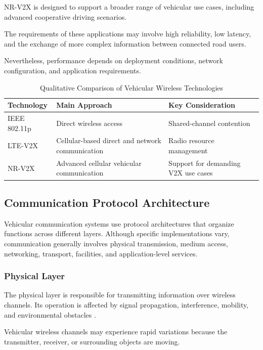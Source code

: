 NR-V2X is designed to support
a broader range of vehicular
use cases, including advanced
cooperative driving scenarios.

The requirements of these
applications may involve
high reliability, low latency,
and the exchange of more
complex information between
connected road users.

Nevertheless, performance
depends on deployment
conditions, network
configuration, and
application requirements.

\begin{table}[htbp]
\centering
\caption{Qualitative Comparison of Vehicular Wireless Technologies}
\label{tab:wireless_technologies}
\footnotesize
\begin{tabular}{|p{1.7cm}|p{2.2cm}|p{2.5cm}|}
\hline
\textbf{Technology} &
\textbf{Main Approach} &
\textbf{Key Consideration} \\
\hline
IEEE 802.11p &
Direct wireless access &
Shared-channel contention \\
\hline
LTE-V2X &
Cellular-based direct and network communication &
Radio resource management \\
\hline
NR-V2X &
Advanced cellular vehicular communication &
Support for demanding V2X use cases \\
\hline
\end{tabular}
\end{table}

\subsection{Communication Protocol Architecture}
\label{sec:2D}

Vehicular communication systems
use protocol architectures
that organize functions across
different layers. Although
specific implementations vary,
communication generally involves
physical transmission,
medium access, networking,
transport, facilities,
and application-level services.

\subsubsection{Physical Layer}

The physical layer is responsible
for transmitting information
over wireless channels.
Its operation is affected
by signal propagation,
interference, mobility,
and environmental obstacles
\cite{Zeadally2012}.

Vehicular wireless channels
may experience rapid variations
because the transmitter,
receiver, or surrounding
objects are moving.

